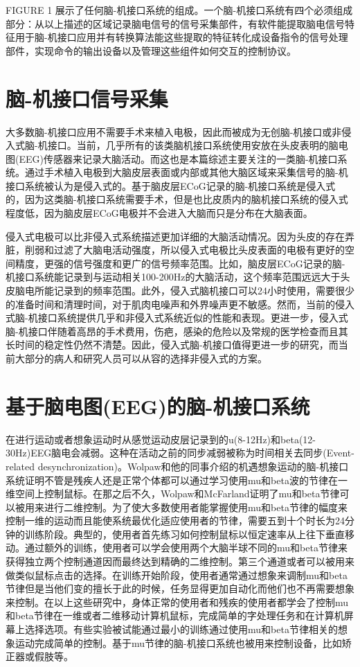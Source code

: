 FIGURE 1 展示了任何脑-机接口系统的组成。一个脑-机接口系统有四个必须组成部分：从以上描述的区域记录脑电信号的信号采集部件，有软件能提取脑电信号特征用于脑-机接口应用并有转换算法能这些提取的特征转化成设备指令的信号处理部件，实现命令的输出设备以及管理这些组件如何交互的控制协议。

\section*{脑-机接口信号采集}
大多数脑-机接口应用不需要手术来植入电极，因此而被成为无创脑-机接口或非侵入式脑-机接口。当前，几乎所有的该类脑机接口系统使用安放在头皮表明的脑电图(EEG)传感器来记录大脑活动。而这也是本篇综述主要关注的一类脑-机接口系统。通过手术植入电极到大脑皮层表面或内部或其他大脑区域来采集信号的脑-机接口系统被认为是侵入式的。基于脑皮层ECoG记录的脑-机接口系统是侵入式的，因为这类脑-机接口系统需要手术，但是也比皮质内的脑机接口系统的侵入式程度低，因为脑皮层ECoG电极并不会进入大脑而只是分布在大脑表面。

侵入式电极可以比非侵入式系统描述更加详细的大脑活动情况。因为头皮的存在弄脏，削弱和过滤了大脑电活动强度，所以侵入式电极比头皮表面的电极有更好的空间精度，更强的信号强度和更广的信号频率范围。比如，脑皮层ECoG记录的脑-机接口系统能记录到与运动相关100-200Hz的大脑活动，这个频率范围远远大于头皮脑电所能记录到的频率范围。此外，侵入式脑机接口可以24小时使用，需要很少的准备时间和清理时间，对于肌肉电噪声和外界噪声更不敏感。然而，当前的侵入式脑-机接口系统提供几乎和非侵入式系统近似的性能和表现。更进一步，侵入式脑-机接口伴随着高昂的手术费用，伤疤，感染的危险以及常规的医学检查而且其长时间的稳定性仍然不清楚。因此，侵入式脑-机接口值得更进一步的研究，而当前大部分的病人和研究人员可以从容的选择非侵入式的方案。

\section*{基于脑电图(EEG)的脑-机接口系统}

在进行运动或者想象运动时从感觉运动皮层记录到的u(8-12Hz)和beta(12-30Hz)EEG脑电会减弱。这种在活动之前的同步减弱被称为时间相关去同步(Event-related desynchronization)。Wolpaw和他的同事介绍的机遇想象运动的脑-机接口系统证明不管是残疾人还是正常个体都可以通过学习使用mu和beta波的节律在一维空间上控制鼠标。在那之后不久，Wolpaw和McFarland证明了mu和beta节律可以被用来进行二维控制。为了使大多数使用者能掌握使用mu和beta节律的幅度来控制一维的运动而且能使系统最优化适应使用者的节律，需要五到十个时长为24分钟的训练阶段。典型的，使用者首先练习如何控制鼠标以恒定速率从上往下垂直移动。通过额外的训练，使用者可以学会使用两个大脑半球不同的mu和beta节律来获得独立两个控制通道因而最终达到精确的二维控制。第三个通道或者可以被用来做类似鼠标点击的选择。在训练开始阶段，使用者通常通过想象来调制mu和beta节律但是当他们变的擅长于此的时候，任务显得更加自动化而他们也不再需要想象来控制。在以上这些研究中，身体正常的使用者和残疾的使用者都学会了控制mu和beta节律在一维或者二维移动计算机鼠标，完成简单的字处理任务和在计算机屏幕上选择选项。有些实验被试能通过最小的训练通过使用mu和beta节律相关的想象运动完成简单的控制。基于mu节律的脑-机接口系统也被用来控制设备，比如矫正器或假肢等。


